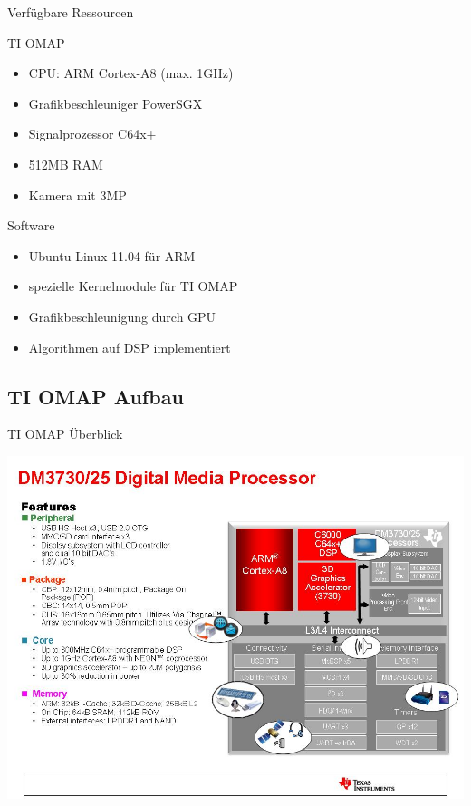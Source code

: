 \documentclass{beamer}
\begin{document}
		\begin{frame}{Verfügbare Ressourcen}
		  \begin{block}{TI OMAP}
		    \begin{itemize}
		      \item CPU: ARM Cortex-A8 (max. 1GHz)
		      \item Grafikbeschleuniger PowerSGX
		      \item Signalprozessor C64x+
		      \item 512MB RAM
		      \item Kamera mit 3MP
		    \end{itemize}
		  \end{block}
		  
		  \begin{block}{Software}
        \begin{itemize}
          \item Ubuntu Linux 11.04 für ARM
          \item spezielle Kernelmodule für TI OMAP
          \item Grafikbeschleunigung durch GPU
          \item Algorithmen auf DSP implementiert
        \end{itemize}
      \end{block}
		\end{frame}

		\subsection{TI OMAP Aufbau}
		\begin{frame}{TI OMAP Überblick}
		  \begin{center}
        \includegraphics[height=0.7\paperheight]{./img/ti-omap.jpg}
      \end{center}
		\end{frame}
		
\end{document}
